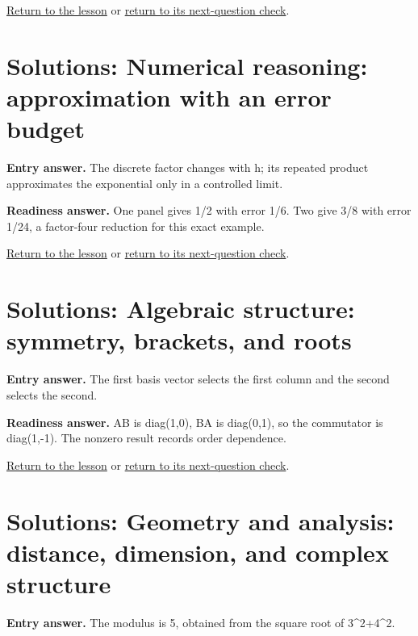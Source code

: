 \hyperref[learn:probability]{Return to the lesson} or \hyperref[readiness:probability]{return to its next-question check}.

\section{Solutions: Numerical reasoning: approximation with an error budget}

\label{solution:entry:numerical}

\textbf{Entry answer.} The discrete factor changes with h; its repeated product approximates the exponential only in a controlled limit.\par

\label{solution:ready:numerical}

\textbf{Readiness answer.} One panel gives 1/2 with error 1/6. Two give 3/8 with error 1/24, a factor-four reduction for this exact example.\par

\hyperref[learn:numerical]{Return to the lesson} or \hyperref[readiness:numerical]{return to its next-question check}.

\section{Solutions: Algebraic structure: symmetry, brackets, and roots}

\label{solution:entry:algebra}

\textbf{Entry answer.} The first basis vector selects the first column and the second selects the second.\par

\label{solution:ready:algebra}

\textbf{Readiness answer.} AB is diag(1,0), BA is diag(0,1), so the commutator is diag(1,-1). The nonzero result records order dependence.\par

\hyperref[learn:algebra]{Return to the lesson} or \hyperref[readiness:algebra]{return to its next-question check}.

\section{Solutions: Geometry and analysis: distance, dimension, and complex structure}

\label{solution:entry:geometry}

\textbf{Entry answer.} The modulus is 5, obtained from the square root of 3\textasciicircum{}2+4\textasciicircum{}2.\par

